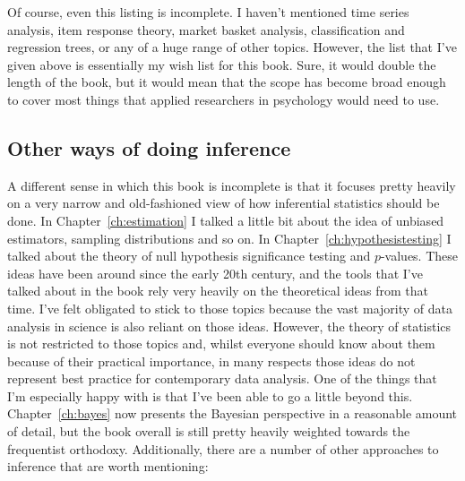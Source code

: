 Of course, even this listing is incomplete. I haven't mentioned time series analysis, item response theory, market basket analysis, classification and regression trees, or any of a huge range of other topics. However, the list that I've given above is essentially my wish list for this book. Sure, it would double the length of the book, but it would mean that the scope has become broad enough to cover most things that applied researchers in psychology would need to use.

\subsection{Other ways of doing inference}

A different sense in which this book is incomplete is that it focuses pretty heavily on a very narrow and old-fashioned view of how inferential statistics should be done. In Chapter~\ref{ch:estimation} I talked a little bit about the idea of unbiased estimators, sampling distributions and so on. In Chapter~\ref{ch:hypothesistesting} I talked about the theory of null hypothesis significance testing and $p$-values. These ideas have been around since the early 20th century, and the tools that I've talked about in the book rely very heavily on the theoretical ideas from that time. I've felt obligated to stick to those topics because the vast majority of data analysis in science is also reliant on those ideas. However, the theory of statistics is not restricted to those topics and, whilst everyone should know about them because of their practical importance, in many respects those ideas do not represent best practice for contemporary data analysis. One of the things that I'm especially happy with is that I've been able to go a little beyond this. Chapter~\ref{ch:bayes} now presents the Bayesian perspective in a reasonable amount of detail, but the book overall is still pretty heavily weighted towards the frequentist orthodoxy. Additionally, there are a number of other approaches to inference that are worth mentioning:

